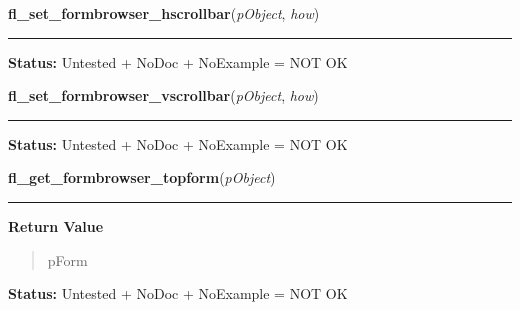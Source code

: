 \hspace{.8\funcindent}\begin{boxedminipage}{\funcwidth}

    \raggedright \textbf{fl\_set\_formbrowser\_hscrollbar}(\textit{pObject}, \textit{how})

    \vspace{-1.5ex}

    \rule{\textwidth}{0.5\fboxrule}
\setlength{\parskip}{2ex}
\setlength{\parskip}{1ex}
\textbf{Status:} Untested + NoDoc + NoExample = NOT OK



    \end{boxedminipage}

    \label{xformslib:library:fl_set_formbrowser_vscrollbar}

    \vspace{0.5ex}

\hspace{.8\funcindent}\begin{boxedminipage}{\funcwidth}

    \raggedright \textbf{fl\_set\_formbrowser\_vscrollbar}(\textit{pObject}, \textit{how})

    \vspace{-1.5ex}

    \rule{\textwidth}{0.5\fboxrule}
\setlength{\parskip}{2ex}
\setlength{\parskip}{1ex}
\textbf{Status:} Untested + NoDoc + NoExample = NOT OK



    \end{boxedminipage}

    \label{xformslib:library:fl_get_formbrowser_topform}

    \vspace{0.5ex}

\hspace{.8\funcindent}\begin{boxedminipage}{\funcwidth}

    \raggedright \textbf{fl\_get\_formbrowser\_topform}(\textit{pObject})

    \vspace{-1.5ex}

    \rule{\textwidth}{0.5\fboxrule}
\setlength{\parskip}{2ex}
\setlength{\parskip}{1ex}
      \textbf{Return Value}
    \vspace{-1ex}

      \begin{quote}
      pForm

      \end{quote}

\textbf{Status:} Untested + NoDoc + NoExample = NOT OK



    \end{boxedminipage}

